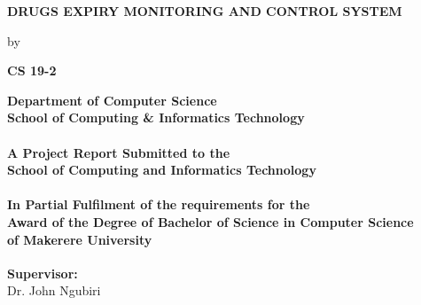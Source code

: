 \documentclass[12pt, a4paper]{report}
\begin{document}

%

\thispagestyle{empty}
\begin{center}


\vspace{3em}%


\Large \textbf {DRUGS EXPIRY MONITORING AND CONTROL SYSTEM}\\%

\vspace{1em}%

\normalsize by \\%

\vspace{1em}

\textup{\small {\bf CS 19-2}\\}

 \vspace{1em}%

{\bf Department of Computer Science \\ School of Computing \& Informatics Technology}\\[0.5in]


\paragraph*{A Project Report Submitted to the \\School of Computing and Informatics Technology}
\paragraph*{In Partial Fulfilment of the requirements for the\\ Award of the Degree of Bachelor of Science in Computer Science\\of Makerere University}

        \vspace{1in}


\normalsize {\bf Supervisor:} \\


Dr. John Ngubiri\\


\end{center}
\end{document}
